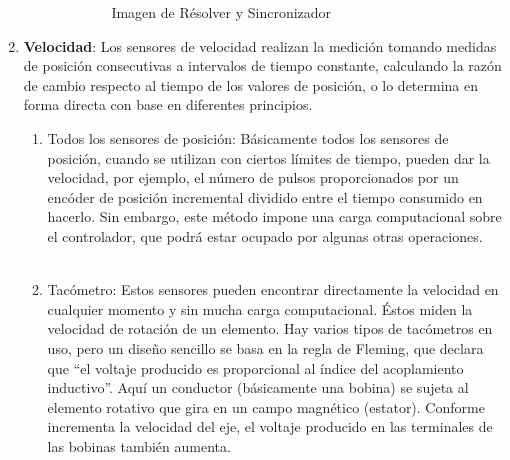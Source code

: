\begin{enumerate}
\begin{enumerate}
\begin{enumerate}
\begin{figure}[!h]
	\centering
	\caption{Imagen de Résolver y Sincronizador}
	\label{fig:Resolver_sinc}
	
	
\end{figure}
		
				\end{enumerate}
			\end{enumerate}
\vspace{10mm}
			\item \textbf{Velocidad}: Los sensores de velocidad realizan la medición tomando medidas de posición consecutivas a intervalos de tiempo constante, calculando la razón de cambio respecto al tiempo de los valores de posición, o lo determina en forma directa con base en diferentes principios.\cite{saha2010robotics}\\
           
			
			\begin{enumerate}
				\item Todos los sensores de posición:
				Básicamente todos los sensores de posición, cuando se utilizan con ciertos límites de tiempo, pueden dar la velocidad, por ejemplo, el número de pulsos proporcionados por un encóder de posición incremental dividido entre el tiempo consumido en hacerlo. Sin embargo, este método impone una carga computacional sobre el controlador, que podrá estar ocupado por algunas otras operaciones. \cite{saha2010robotics}\\\\
		
		\begin{figure}[!ht]
			\centering
			\hfill
		\end{figure}
				
				\item Tacómetro: Estos sensores pueden encontrar directamente la velocidad en cualquier momento y sin mucha carga computacional. Éstos miden la velocidad de rotación de un elemento. Hay varios tipos de tacómetros en uso, pero un diseño sencillo se basa en la regla de Fleming, que declara que “el voltaje producido es proporcional al índice del acoplamiento inductivo”. Aquí un conductor (básicamente una bobina) se sujeta al elemento rotativo que gira en un campo magnético (estator). Conforme incrementa la velocidad del eje, el voltaje producido en las terminales de las bobinas también aumenta.\cite{saha2010robotics}\\
				

\end{enumerate}
\end{enumerate}
